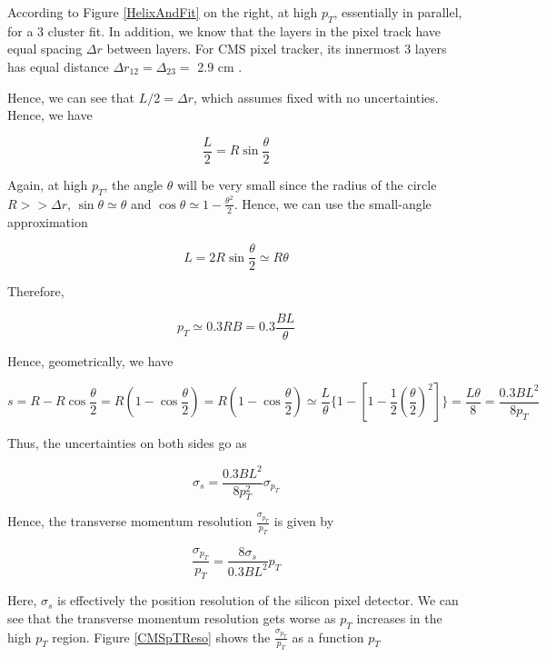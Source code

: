According to Figure \ref{HelixAndFit} on the right, at high $p_T$, essentially in parallel, for a 3 cluster fit. In addition, we know that the layers in the pixel track have equal spacing $\Delta r$ between layers. For CMS pixel tracker, its innermost 3 layers has equal distance $\Delta r_{12} = \Delta_{23} =$ 2.9 cm \cite{CMSPIXInfo}. 


Hence, we can see that $L/2 = \Delta r$, which assumes fixed with no uncertainties. Hence, we have

\begin{equation}
\frac{L}{2} = R \sin \frac{\theta}{2}
\end{equation}

Again, at high $p_T$, the angle $\theta$ will be very small since the radius of the circle $R >> \Delta r$, $\sin\theta \simeq \theta$ and $\cos\theta \simeq 1 - \frac{\theta^2}{2}$. Hence, we can use the small-angle approximation

\begin{equation}
L = 2 R \sin \frac{\theta}{2} \simeq R \theta
\end{equation}

Therefore,

\begin{equation}
p_T  \simeq 0.3 RB = 0.3 \frac{BL}{\theta}
\end{equation}


Hence, geometrically, we have


\begin{equation}
s = R - R \cos \frac{\theta}{2} = R (1 -  \cos \frac{\theta}{2}) =  R (1 -  \cos \frac{\theta}{2})  \simeq  \frac{L}{\theta} \{1 - [1 - \frac{1}{2} (\frac{\theta}{2})^2] \} =  \frac{L\theta}{8} = \frac{0.3BL^2}{8p_T}
\end{equation}

Thus, the uncertainties on both sides go as 

\begin{equation}
\sigma_s =  \frac{0.3BL^2}{8p_T^2} \sigma_{p_T}
\end{equation}

Hence, the transverse momentum resolution $\frac{\sigma_{p_T}}{p_T}$ is given by 


\begin{equation}
\frac{\sigma_{p_T}}{p_T} = \frac{8\sigma_s}{0.3BL^2} p_T
\end{equation}

Here, $\sigma_s$ is effectively the position resolution of the silicon pixel detector. We can see that the transverse momentum resolution gets worse as $p_T$ increases in the high $p_T$ region. Figure \ref{CMSpTReso} shows the $\frac{\sigma_{p_T}}{p_T}$ as a function $p_T$


